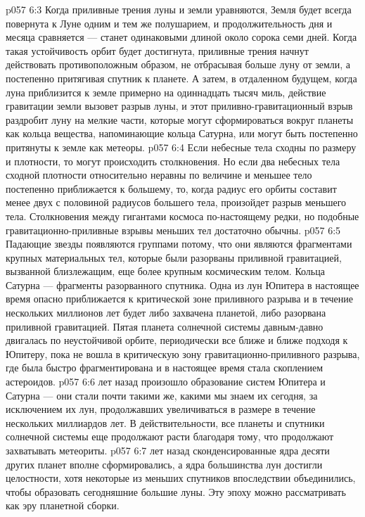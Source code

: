 \vs p057 6:3 Когда приливные трения луны и земли уравняются, Земля будет всегда повернута к Луне одним и тем же полушарием, и продолжительность дня и месяца сравняется --- станет одинаковыми длиной около сорока семи дней. Когда такая устойчивость орбит будет достигнута, приливные трения начнут действовать противоположным образом, не отбрасывая больше луну от земли, а постепенно притягивая спутник к планете. А затем, в отдаленном будущем, когда луна приблизится к земле примерно на одиннадцать тысяч миль, действие гравитации земли вызовет разрыв луны, и этот приливно\hyp{}гравитационный взрыв раздробит луну на мелкие части, которые могут сформироваться вокруг планеты как кольца вещества, напоминающие кольца Сатурна, или могут быть постепенно притянуты к земле как метеоры.
\vs p057 6:4 Если небесные тела сходны по размеру и плотности, то могут происходить столкновения. Но если два небесных тела сходной плотности относительно неравны по величине и меньшее тело постепенно приближается к большему, то, когда радиус его орбиты составит менее двух с половиной радиусов большего тела, произойдет разрыв меньшего тела. Столкновения между гигантами космоса по\hyp{}настоящему редки, но подобные гравитационно\hyp{}приливные взрывы меньших тел достаточно обычны.
\vs p057 6:5 Падающие звезды появляются группами потому, что они являются фрагментами крупных материальных тел, которые были разорваны приливной гравитацией, вызванной близлежащим, еще более крупным космическим телом. Кольца Сатурна --- фрагменты разорванного спутника. Одна из лун Юпитера в настоящее время опасно приближается к критической зоне приливного разрыва и в течение нескольких миллионов лет будет либо захвачена планетой, либо разорвана приливной гравитацией. Пятая планета солнечной системы давным\hyp{}давно двигалась по неустойчивой орбите, периодически все ближе и ближе подходя к Юпитеру, пока не вошла в критическую зону гравитационно\hyp{}приливного разрыва, где была быстро фрагментирована и в настоящее время стала скоплением астероидов.
\vs p057 6:6 \pc {} лет назад произошло образование систем Юпитера и Сатурна --- они стали почти такими же, какими мы знаем их сегодня, за исключением их лун, продолжавших увеличиваться в размере в течение нескольких миллиардов лет. В действительности, все планеты и спутники солнечной системы еще продолжают расти благодаря тому, что продолжают захватывать метеориты.
\vs p057 6:7 \pc {} лет назад сконденсированные ядра десяти других планет вполне сформировались, а ядра большинства лун достигли целостности, хотя некоторые из меньших спутников впоследствии объединились, чтобы образовать сегодняшние большие луны. Эту эпоху можно рассматривать как эру планетной сборки.
